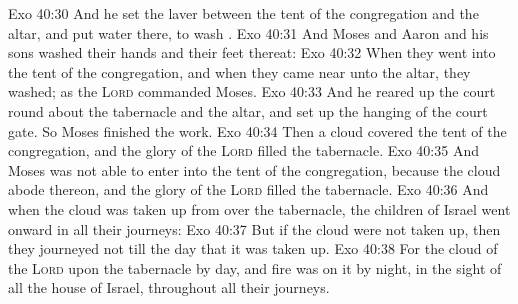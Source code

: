 \vs Exo 40:30 And he set the laver between the tent of the congregation and the altar, and put water there, to wash .
\vs Exo 40:31 And Moses and Aaron and his sons washed their hands and their feet thereat:
\vs Exo 40:32 When they went into the tent of the congregation, and when they came near unto the altar, they washed; as the \textsc{Lord} commanded Moses.
\vs Exo 40:33 And he reared up the court round about the tabernacle and the altar, and set up the hanging of the court gate. So Moses finished the work.
\vs Exo 40:34 Then a cloud covered the tent of the congregation, and the glory of the \textsc{Lord} filled the tabernacle.
\vs Exo 40:35 And Moses was not able to enter into the tent of the congregation, because the cloud abode thereon, and the glory of the \textsc{Lord} filled the tabernacle.
\vs Exo 40:36 And when the cloud was taken up from over the tabernacle, the children of Israel went onward in all their journeys:
\vs Exo 40:37 But if the cloud were not taken up, then they journeyed not till the day that it was taken up.
\vs Exo 40:38 For the cloud of the \textsc{Lord}  upon the tabernacle by day, and fire was on it by night, in the sight of all the house of Israel, throughout all their journeys.
